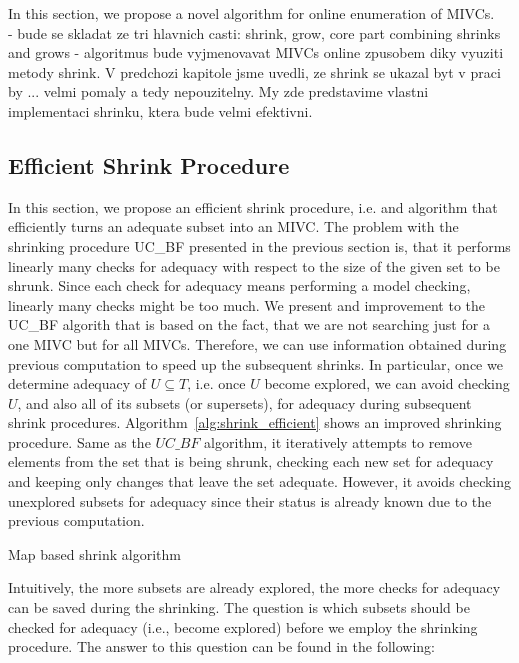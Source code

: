 In this section, we propose a novel algorithm for online enumeration of MIVCs. \\
- bude se skladat ze tri hlavnich casti: shrink, grow, core part combining shrinks and grows
- algoritmus bude vyjmenovavat MIVCs online zpusobem diky vyuziti metody shrink. V predchozi kapitole jsme uvedli, ze shrink se ukazal byt v praci by ... velmi pomaly a tedy nepouzitelny. My zde predstavime vlastni implementaci shrinku, ktera bude velmi efektivni. 

\subsection{Efficient Shrink Procedure}
In this section, we propose an efficient shrink procedure, i.e. and algorithm that efficiently turns an adequate subset into an MIVC. The problem with the shrinking procedure UC\_BF presented in the previous section is, that it performs linearly many checks for adequacy with respect to the size of the given set to be shrunk. Since each check for adequacy means performing a model checking, linearly many checks might be too much. 
We present and improvement to the UC\_BF algorith that is based on the fact, that we are not searching just for a one MIVC but for all MIVCs. Therefore, we can use information obtained during previous computation to speed up the subsequent shrinks. In particular, once we determine adequacy of $U \subseteq T$, i.e. once $U$ become explored, we can avoid checking $U$, and also all of its subsets (or supersets), for adequacy during subsequent shrink procedures. 
Algorithm~\ref{alg:shrink_efficient} shows an improved shrinking procedure. Same as the $UC\_BF$ algorithm, it iteratively attempts to remove elements from the set that is being
shrunk, checking each new set for adequacy and keeping only changes that
leave the set adequate. However, it avoids checking unexplored subsets for adequacy since their status is already known due to the previous computation. 

\begin{algorithm}[!t]

\caption{Map based shrink algorithm}
\end{algorithm}

Intuitively, the more subsets are already explored, the more checks for adequacy can be saved during the shrinking. The question is which subsets should be checked for adequacy (i.e., become explored) before we employ the shrinking procedure. The answer to this question can be found in the following:

